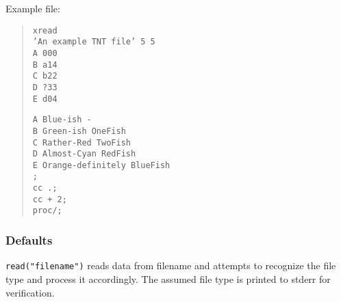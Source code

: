 \documentclass[11pt]{article}
\begin{document}
		    Example file:
		    	\begin{quote}
		    	\texttt{xread\\
		    	'An example TNT file' 5 5\\
		    	A 000\\
		    	B a14\\
		    	C b22\\
		    	D ?33\\
		    	E d04\\}
		    	
		    	\texttt{A Blue-ish -\\
		    	B Green-ish OneFish\\
		    	C Rather-Red TwoFish\\
		    	D Almost-Cyan RedFish\\
		    	E Orange-definitely BlueFish\\
		    	;\\
		    	cc .;\\
		    	cc + 2;\\
		    	proc/;\\}
		    \end{quote}
			
		\subsubsection{Defaults}
			\texttt{read("filename")} reads data from filename and attempts to recognize the file type
			and process it accordingly.  The assumed file type is printed to stderr for verification.
\end{document}
